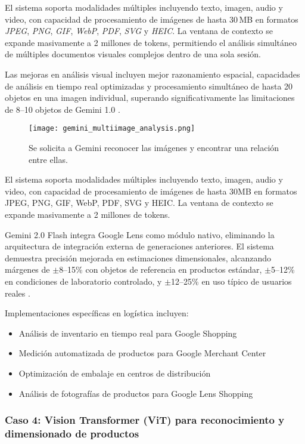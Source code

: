 El sistema soporta modalidades múltiples incluyendo texto, imagen, audio y video, con capacidad de procesamiento de imágenes de hasta 30\,MB en formatos \textit{JPEG}, \textit{PNG}, \textit{GIF}, \textit{WebP}, \textit{PDF}, \textit{SVG} y \textit{HEIC}. La ventana de contexto se expande masivamente a 2 millones de tokens, permitiendo el análisis simultáneo de múltiples documentos visuales complejos dentro de una sola sesión.

Las mejoras en análisis visual incluyen mejor razonamiento espacial, capacidades de análisis en tiempo real optimizadas y procesamiento simultáneo de hasta 20 objetos en una imagen individual, superando significativamente las limitaciones de 8--10 objetos de Gemini 1.0 \cite{Team20251}.


\begin{figure}[H]
    \centering
    \texttt{[image: gemini\_multiimage\_analysis.png]}
    \caption{Se solicita a Gemini reconocer las imágenes y encontrar una relación entre ellas.}
    \label{fig:gemini_analysis}
\end{figure}

El sistema soporta modalidades múltiples incluyendo texto, imagen, audio y video, con capacidad de procesamiento de imágenes de hasta 30MB en formatos JPEG, PNG, GIF, WebP, PDF, SVG y HEIC. La ventana de contexto se expande masivamente a 2 millones de tokens.

Gemini 2.0 Flash integra Google Lens como módulo nativo, eliminando la arquitectura de integración externa de generaciones anteriores. El sistema demuestra precisión mejorada en estimaciones dimensionales, alcanzando márgenes de $\pm$8--15\% con objetos de referencia en productos estándar, $\pm$5--12\% en condiciones de laboratorio controlado, y $\pm$12--25\% en uso típico de usuarios reales \cite{Team20252}.

Implementaciones específicas en logística incluyen:
\begin{itemize}
    \item Análisis de inventario en tiempo real para Google Shopping
    \item Medición automatizada de productos para Google Merchant Center
    \item Optimización de embalaje en centros de distribución
    \item Análisis de fotografías de productos para Google Lens Shopping
\end{itemize}

\subsubsection{Caso 4: Vision Transformer (ViT) para reconocimiento y dimensionado de productos}


